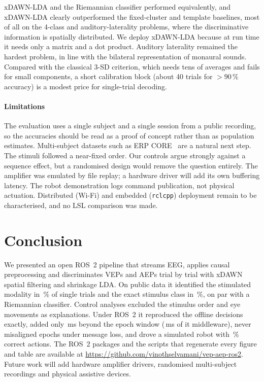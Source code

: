 \documentclass[conference]{IEEEtran}
\begin{document}
xDAWN-LDA and the Riemannian classifier performed equivalently, and xDAWN-LDA clearly outperformed the fixed-cluster and template baselines, most of all on the 4-class and auditory-laterality problems, where the discriminative information is spatially distributed. We deploy xDAWN-LDA because at run time it needs only a matrix and a dot product. Auditory laterality remained the hardest problem, in line with the bilateral representation of monaural sounds. Compared with the classical 3-SD criterion, which needs tens of averages and fails for small components, a short calibration block (about 40 trials for ${>}90$\,\% accuracy) is a modest price for single-trial decoding.

\paragraph*{Limitations} The evaluation uses a single subject and a single session from a public recording, so the accuracies should be read as a proof of concept rather than as population estimates. Multi-subject datasets such as ERP CORE~\cite{kappenman2021erpcore} are a natural next step. The stimuli followed a near-fixed order. Our controls argue strongly against a sequence effect, but a randomised design would remove the question entirely. The amplifier was emulated by file replay; a hardware driver will add its own buffering latency. The robot demonstration logs command publication, not physical actuation. Distributed (Wi-Fi) and embedded (\texttt{rclcpp}) deployment remain to be characterised, and no LSL comparison was made.

\section{Conclusion}
We presented an open ROS~2 pipeline that streams EEG, applies causal preprocessing and discriminates VEPs and AEPs trial by trial with xDAWN spatial filtering and shrinkage LDA. On public data it identified the stimulated modality in \AccModX\,\% of single trials and the exact stimulus class in \AccFourX\,\%, on par with a Riemannian classifier. Control analyses excluded the stimulus order and eye movements as explanations. Under ROS~2 it reproduced the offline decisions exactly, added only \RosExcess\,ms beyond the epoch window (\Overhead\,ms of it middleware), never misaligned epochs under message loss, and drove a simulated robot with \RobotAcc\,\% correct actions. The ROS~2 packages and the scripts that regenerate every figure and table are available at \url{https://github.com/vinothselvamani/vep-aep-ros2}. Future work will add hardware amplifier drivers, randomised multi-subject recordings and physical assistive devices.




\end{document}

